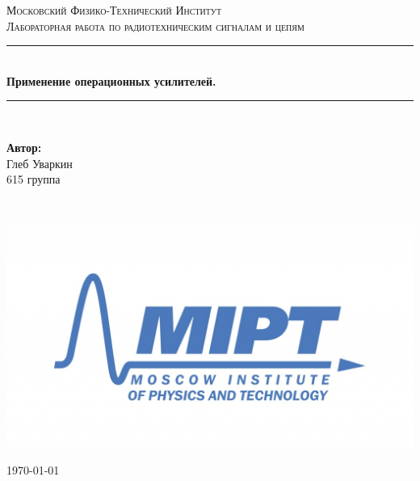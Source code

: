 \documentclass[a4paper, 12pt, twoside]{article}
\newenvironment{bottompar}{\par\vspace*{\fill}}{\clearpage}
\begin{document}
\begin{titlepage}

\newcommand{\HRule}{\rule{\linewidth}{0.7mm}} %

\center %
 

\textsc{\LARGE Московский Физико-Технический Институт}\\[1,5cm] %

\textsc{\large Лабораторная работа по радиотехническим сигналам и цепям}\\[0.5cm] %


\HRule
\\[0.4cm]
{ \huge \bfseries Применение операционных усилителей.}
\\[0.4cm] %
\HRule
\\[1.5cm]


 


	\begin{center} \large
		\textbf{Автор:}\\
		Глеб Уваркин \\
		615 группа
	\end{center}

~


\begin{bottompar}
	\begin{center}
		\includegraphics[width = 80 mm]{logo.jpg}
	\end{center}
	{\large \today}

\end{bottompar}
\vfill %

\end{titlepage}
\end{document}
